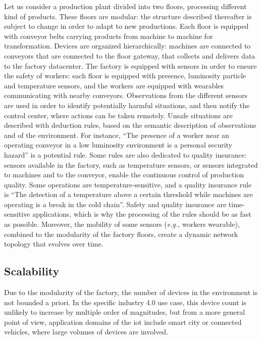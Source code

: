 \documentclass{iosart2c}
\begin{document}
Let us consider a production plant divided into two floors, processing different kind of products. 
These floors are modular: the structure described thereafter is subject to change in order to adapt to new productions.
Each floor is equipped with conveyor belts carrying products from machine to machine for transformation. 
Devices are organized hierarchically: machines are connected to conveyors that are connected to the floor gateway, that collects and delivers data to the factory datacenter. 
The factory is equipped with sensors in order to ensure the safety of workers: each floor is equipped with presence, luminosity particle and temperature sensors, and the workers are equipped with wearables communicating with nearby conveyors.
Observations from the different sensors are used in order to identify potentially harmful situations, and then notify the control center, where actions can be taken remotely.
Unsafe situations are described with deduction rules, based on the semantic description of observations and of the environment.
For instance, %
``The presence of a worker near an operating conveyor in a low luminosity environment is a personal security hazard'' is a potential rule.
Some rules are also dedicated to quality insurance: sensors available in the factory, such as temperature sensors, or sensors integrated to machines and to the conveyor, enable the continuous control of production quality.
Some operations are temperature-sensitive, and a quality insurance rule is ``The detection of a temperature above a certain threshold while machines are operating is a break in the cold chain''.
Safety and quality insurance are time-sensitive applications, which is why the processing of the rules should be as fast as possible.
Moreover, the mobility of some sensors (\textit{e.g.,} workers wearable), combined to the modularity of the factory floors, create a dynamic network topology that evolves over time.

\subsection{Scalability}

Due to the modularity of the factory, the number of devices in the environment is not bounded a priori. 
In the specific industry 4.0 use case, this device count is unlikely to increase by multiple order of magnitudes, but from a more general point of view, application domains of the \gls{iot} include smart city or connected vehicles, where large volumes of devices are involved.
\end{document}
